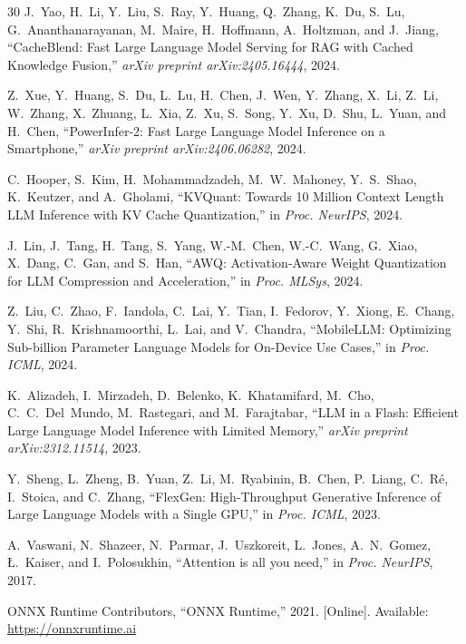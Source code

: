 \documentclass[journal]{IEEEtran}
\begin{document}
\begin{thebibliography}{30}
J.~Yao, H.~Li, Y.~Liu, S.~Ray, Y.~Huang, Q.~Zhang, K.~Du, S.~Lu, G.~Ananthanarayanan, M.~Maire, H.~Hoffmann, A.~Holtzman, and J.~Jiang,
``{CacheBlend: Fast Large Language Model Serving for RAG with Cached Knowledge Fusion},''
\emph{arXiv preprint arXiv:2405.16444}, 2024.

Z.~Xue, Y.~Huang, S.~Du, L.~Lu, H.~Chen, J.~Wen, Y.~Zhang, X.~Li, Z.~Li, W.~Zhang, X.~Zhuang, L.~Xia, Z.~Xu, S.~Song, Y.~Xu, D.~Shu, L.~Yuan, and H.~Chen,
``{PowerInfer-2: Fast Large Language Model Inference on a Smartphone},''
\emph{arXiv preprint arXiv:2406.06282}, 2024.

C.~Hooper, S.~Kim, H.~Mohammadzadeh, M.~W.~Mahoney, Y.~S.~Shao, K.~Keutzer, and A.~Gholami,
``{KVQuant: Towards 10 Million Context Length LLM Inference with KV Cache Quantization},''
in \emph{Proc. NeurIPS}, 2024.

J.~Lin, J.~Tang, H.~Tang, S.~Yang, W.-M.~Chen, W.-C.~Wang, G.~Xiao, X.~Dang, C.~Gan, and S.~Han,
``{AWQ: Activation-Aware Weight Quantization for LLM Compression and Acceleration},''
in \emph{Proc. MLSys}, 2024.

Z.~Liu, C.~Zhao, F.~Iandola, C.~Lai, Y.~Tian, I.~Fedorov, Y.~Xiong, E.~Chang, Y.~Shi, R.~Krishnamoorthi, L.~Lai, and V.~Chandra,
``{MobileLLM: Optimizing Sub-billion Parameter Language Models for On-Device Use Cases},''
in \emph{Proc. ICML}, 2024.

K.~Alizadeh, I.~Mirzadeh, D.~Belenko, K.~Khatamifard, M.~Cho, C.~C.~Del~Mundo, M.~Rastegari, and M.~Farajtabar,
``{LLM in a Flash: Efficient Large Language Model Inference with Limited Memory},''
\emph{arXiv preprint arXiv:2312.11514}, 2023.

Y.~Sheng, L.~Zheng, B.~Yuan, Z.~Li, M.~Ryabinin, B.~Chen, P.~Liang, C.~R\'{e}, I.~Stoica, and C.~Zhang,
``{FlexGen: High-Throughput Generative Inference of Large Language Models with a Single GPU},''
in \emph{Proc. ICML}, 2023.

A.~Vaswani, N.~Shazeer, N.~Parmar, J.~Uszkoreit, L.~Jones, A.~N.~Gomez, {\L}.~Kaiser, and I.~Polosukhin,
``{Attention is all you need},''
in \emph{Proc. NeurIPS}, 2017.

ONNX Runtime Contributors,
``{ONNX Runtime},''
2021. [Online]. Available: \url{https://onnxruntime.ai}

\end{thebibliography}
\end{document}
